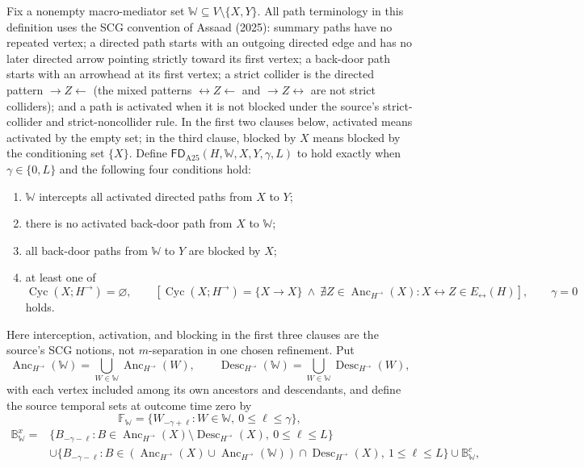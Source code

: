 Fix a nonempty macro-mediator set \(\mathbb W\subseteq V\setminus\{X,Y\}\).  All path terminology in this definition uses the SCG convention of Assaad (2025): summary paths have no repeated vertex; a directed path starts with an outgoing directed edge and has no later directed arrow pointing strictly toward its first vertex; a back-door path starts with an arrowhead at its first vertex; a strict collider is the directed pattern \(\to Z\leftarrow\) (the mixed patterns \(\leftrightarrow Z\leftarrow\) and \(\to Z\leftrightarrow\) are not strict colliders); and a path is activated when it is not blocked under the source's strict-collider and strict-noncollider rule.  In the first two clauses below, activated means activated by the empty set; in the third clause, blocked by \(X\) means blocked by the conditioning set \(\{X\}\).  Define \(\mathsf{FD}_{\mathrm{A25}}(H,\mathbb W,X,Y,\gamma,L)\) to hold exactly when \(\gamma\in\{0,L\}\) and the following four conditions hold:
\begin{enumerate}
\item \(\mathbb W\) intercepts all activated directed paths from \(X\) to \(Y\);
\item there is no activated back-door path from \(X\) to \(\mathbb W\);
\item all back-door paths from \(\mathbb W\) to \(Y\) are blocked by \(X\);
\item at least one of
\[
 \operatorname{Cyc}(X;H^{\to})=\varnothing,
 \qquad
 \left[\operatorname{Cyc}(X;H^{\to})=\{X\to X\}
 \ \wedge\ 
 \nexists Z\in\operatorname{Anc}_{H^{\to}}(X):
 X\leftrightarrow Z\in E_{\leftrightarrow}(H)\right],
 \qquad
 \gamma=0
\]
holds.
\end{enumerate}
Here interception, activation, and blocking in the first three clauses are the source's SCG notions, not \(m\)-separation in one chosen refinement.  Put
\[
 \operatorname{Anc}_{H^{\to}}(\mathbb W)
 =\bigcup_{W\in\mathbb W}\operatorname{Anc}_{H^{\to}}(W),
 \qquad
 \operatorname{Desc}_{H^{\to}}(\mathbb W)
 =\bigcup_{W\in\mathbb W}\operatorname{Desc}_{H^{\to}}(W),
\]
with each vertex included among its own ancestors and descendants, and define the source temporal sets at outcome time zero by
\[
 \mathbb F_{\mathbb W}
 =\{W_{-\gamma+\ell}:W\in\mathbb W,\ 0\le \ell\le\gamma\},
\]
\[
 \begin{split}
 \mathbb B^x_{\mathbb W}
 ={}&\{B_{-\gamma-\ell}:B\in
 \operatorname{Anc}_{H^{\to}}(X)\setminus
 \operatorname{Desc}_{H^{\to}}(X),\ 0\le\ell\le L\}\\
 &\cup\{B_{-\gamma-\ell}:B\in
 (\operatorname{Anc}_{H^{\to}}(X)\cup
 \operatorname{Anc}_{H^{\to}}(\mathbb W))\cap
 \operatorname{Desc}_{H^{\to}}(X),\ 1\le\ell\le L\}
 \cup\mathbb B^c_{\mathbb W},
 \end{split}
\]
